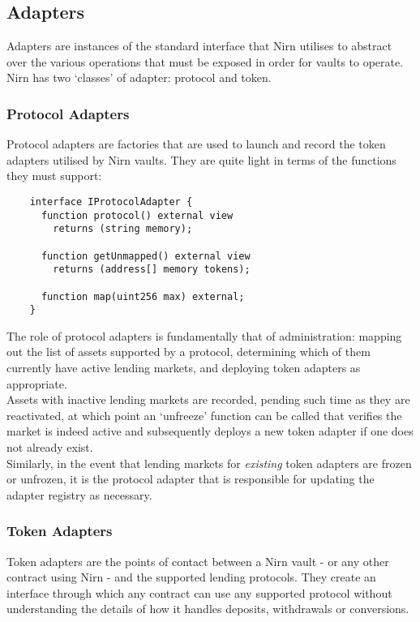 \documentclass{article}
\begin{document}
\subsection{Adapters}

Adapters are instances of the standard interface that Nirn utilises to abstract over the various operations that must be exposed in order for vaults to operate. Nirn has two `classes' of adapter: protocol and token.

\subsubsection{Protocol Adapters}

Protocol adapters are factories that are used to launch and record the token adapters utilised by Nirn vaults. They are quite light in terms of the functions they must support:

\begin{verbatim}
    interface IProtocolAdapter {
      function protocol() external view
        returns (string memory);
      
      function getUnmapped() external view
        returns (address[] memory tokens);
      
      function map(uint256 max) external;
    }
\end{verbatim}

\noindent
The role of protocol adapters is fundamentally that of administration: mapping out the list of assets supported by a protocol, determining which of them currently have active lending markets, and deploying token adapters as appropriate.\\

\noindent
Assets with inactive lending markets are recorded, pending such time as they are reactivated, at which point an `unfreeze' function can be called that verifies the market is indeed active and subsequently deploys a new token adapter if one does not already exist.\\

\noindent
Similarly, in the event that lending markets for \textit{existing} token adapters are frozen or unfrozen, it is the protocol adapter that is responsible for updating the adapter registry as necessary.

\subsubsection{Token Adapters}

Token adapters are the points of contact between a Nirn vault - or any other contract using Nirn - and the supported lending protocols. They create an interface through which any contract can use any supported protocol without understanding the details of how it handles deposits, withdrawals or conversions.\\
\end{document}
